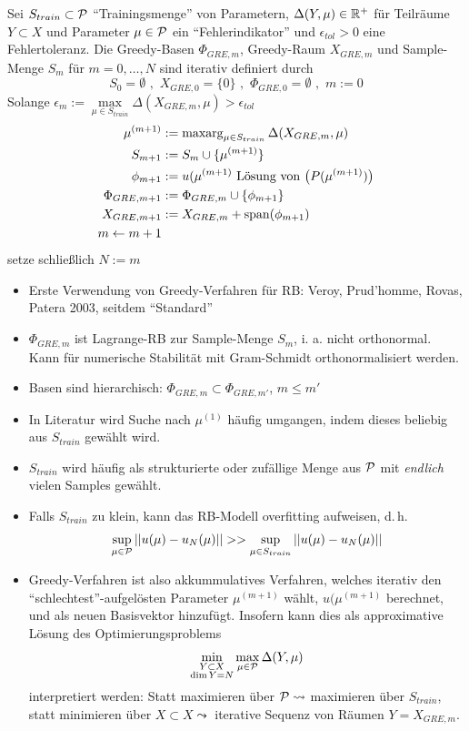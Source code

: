 \begin{defn}
	Sei $S_{train} \subset \mathcal{P}$ ``Trainingsmenge'' von Parametern, $\Delta (Y,\mu) \in \mathbb{R}^+$ für Teilräume $Y \subset X$ und Parameter $\mu \in \mathcal{P}$ ein ``Fehlerindikator'' und $\epsilon_{tol} > 0$ eine Fehlertoleranz. Die Greedy-Basen $\Phi_{GRE,m}$, Greedy-Raum $X_{GRE,m}$ und Sample-Menge $S_m$ für $m=0,\dots,N$ sind iterativ definiert durch
	\[
		S_0 = \emptyset \,\, , \,\, X_{GRE,0} = \{0\} \,\, , \,\, \Phi_{GRE,0} = \emptyset \,\, , \,\, m:=0
	\]
Solange $\epsilon_m := \max\limits_{\mu \in S_{train}} \Delta(X_{GRE,m},\mu) > \epsilon_{tol}$
\begin{align*}
	\mu^{(m+1)} &:= \op{max arg}\limits_{\mu \in S_{train}} \Delta(X_{GRE,m},\mu) \\
	S_{m+1} &:= S_m \cup \{\mu^{(m+1)}\} \\
	\phi_{m+1} &:= u(\mu^{(m+1)} \text{ Lösung von } \prob[\mu^{(m+1)}] \\
	\Phi_{GRE,m+1} &:= \Phi_{GRE,m} \cup \{\phi_{m+1}\} \\
	X_{GRE,m+1} &:= X_{GRE,m} + \op{span}(\phi_{m+1}) \\
	m \leftarrow m+1
\end{align*}
setze schließlich $N:=m$
\end{defn}

\begin{bem} \beginwithlistbem
	\begin{itemize}
		\item Erste  Verwendung von Greedy-Verfahren für RB: Veroy, Prud'homme, Rovas, Patera 2003, seitdem ``Standard''
		\item $\Phi_{GRE,m}$ ist Lagrange-RB zur Sample-Menge $S_m$, i. a. nicht orthonormal. Kann für numerische Stabilität mit Gram-Schmidt orthonormalisiert werden.
		\item Basen sind hierarchisch: $\Phi_{GRE,m} \subset \Phi_{GRE,m'}$, $m \leq m'$
		\item In Literatur wird Suche nach $\mu^{(1)}$ häufig umgangen, indem dieses beliebig aus $S_{train}$ gewählt wird.
		\item $S_{train}$ wird häufig als strukturierte oder zufällige Menge aus $\mathcal{P}$ mit \emph{endlich} vielen Samples gewählt.
		\item Falls $S_{train}$ zu klein, kann das RB-Modell overfitting aufweisen, d.\,h.
		\[
			\sup\limits_{\mu \in \mathcal{P}} || u(\mu) - u_N(\mu) || >> \sup\limits_{\mu \in S_{train}} || u(\mu) - u_N(\mu) ||
		\]
		\item Greedy-Verfahren ist also akkummulatives Verfahren, welches iterativ den ``schlechtest''-aufgelösten Parameter $\mu^{(m+1)}$ wählt, $u(\mu^{(m+1)}$ berechnet, und als neuen Basisvektor hinzufügt. Insofern kann dies als approximative Lösung des Optimierungsproblems
		\[
			\min\limits_{\substack{Y \subset X \\ \dim Y = N}} \max\limits_{\mu \in \mathcal{P}} \Delta (Y,\mu)
		\]
	interpretiert werden: Statt maximieren über $\mathcal{P} \leadsto	$ maximieren über $S_{train}$, statt minimieren über $X \subset X \leadsto$ iterative Sequenz von Räumen $Y = X_{GRE,m}$.
	\end{itemize}
\end{bem}

